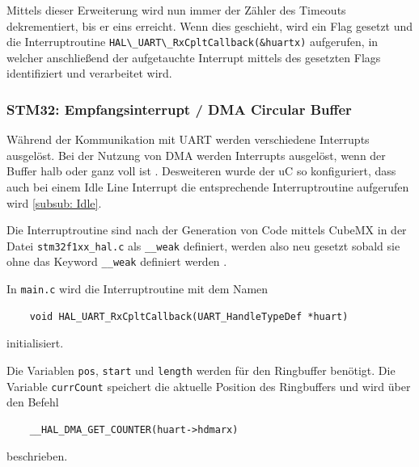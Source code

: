   Mittels dieser Erweiterung wird nun immer der Zähler des Timeouts dekrementiert, bis er eins erreicht. Wenn dies geschieht, wird ein Flag gesetzt
  und die Interruptroutine \lstinline!HAL\_UART\_RxCpltCallback(&huartx)! aufgerufen, in welcher anschließend der aufgetauchte Interrupt mittels des
  gesetzten Flags identifiziert und verarbeitet wird.
  
  \subsubsection{STM32: Empfangsinterrupt / DMA Circular Buffer}
  \label{subsub: Empfang}

  Während der Kommunikation mit \ac{UART} werden verschiedene Interrupts ausgelöst. Bei der Nutzung von \ac{DMA} werden Interrupts ausgelöst,
  wenn der Buffer halb oder ganz voll ist \citep{STM32_Ref}. Desweiteren wurde der \ac{uC} so konfiguriert, dass auch bei einem Idle Line Interrupt
  die entsprechende Interruptroutine aufgerufen wird \ref{subsub: Idle}.

  \smallskip

  Die Interruptroutine sind nach der Generation von Code mittels CubeMX in der Datei \lstinline!stm32f1xx_hal.c! als \lstinline!__weak!
  definiert, werden also neu gesetzt sobald sie ohne das Keyword \lstinline!__weak! definiert werden \citep{HAL_Description}. 

  \smallskip

  In \lstinline!main.c! wird die Interruptroutine mit dem Namen 
  \begin{lstlisting}
    void HAL_UART_RxCpltCallback(UART_HandleTypeDef *huart)
  \end{lstlisting}
  initialisiert. 
  
  \smallskip

  Die Variablen \lstinline!pos!, \lstinline!start! und \lstinline!length! werden für den Ringbuffer benötigt. Die Variable \lstinline!currCount! speichert die aktuelle Position des
  Ringbuffers und wird über den Befehl
  
  \begin{lstlisting}
    __HAL_DMA_GET_COUNTER(huart->hdmarx)
  \end{lstlisting}
  beschrieben.

  \smallskip

